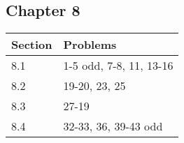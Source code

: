 \documentclass[
]{book}
\begin{document}
\hypertarget{chapter-8-1}{%
\subsection{Chapter 8}\label{chapter-8-1}}

\begin{tabular}{l|l}
\hline
Section & Problems\\
\hline
8.1 & 1-5 odd, 7-8, 11, 13-16\\
\hline
8.2 & 19-20, 23, 25\\
\hline
8.3 & 27-19\\
\hline
8.4 & 32-33, 36, 39-43 odd\\
\hline
\end{tabular}

  
\end{document}

